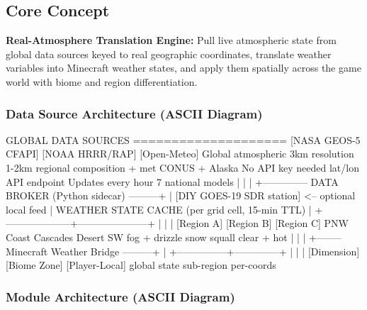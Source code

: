 \documentclass[11pt,letterpaper]{article}
\begin{document}
\subsection{Core Concept}

\textbf{Real-Atmosphere Translation Engine:} Pull live atmospheric state from global data sources keyed to real geographic coordinates, translate weather variables into Minecraft weather states, and apply them spatially across the game world with biome and region differentiation.

\subsubsection{Data Source Architecture (ASCII Diagram)}

\begin{asciibox}
GLOBAL DATA SOURCES
====================
  [NASA GEOS-5 CFAPI]         [NOAA HRRR/RAP]           [Open-Meteo]
  Global atmospheric          3km resolution             1-2km regional
  composition + met           CONUS + Alaska             No API key needed
  lat/lon API endpoint        Updates every hour         7 national models
         |                          |                          |
         +-------------- DATA BROKER (Python sidecar) ---------+
                                    |
                   [DIY GOES-19 SDR station]  <-- optional local feed
                                    |
                         WEATHER STATE CACHE
                         (per grid cell, 15-min TTL)
                                    |
              +--------------------+---------------------+
              |                    |                     |
         [Region A]           [Region B]           [Region C]
         PNW Coast             Cascades             Desert SW
         fog + drizzle         snow squall          clear + hot
              |                    |                     |
              +-------- Minecraft Weather Bridge ---------+
                                    |
                    +---------------+--------------+
                    |               |              |
               [Dimension]    [Biome Zone]    [Player-Local]
               global state   sub-region      per-coords
\end{asciibox}

\subsubsection{Module Architecture (ASCII Diagram)}
\end{document}
